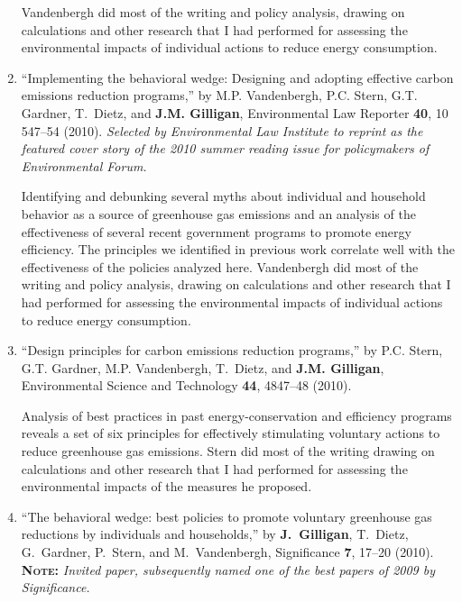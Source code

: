 \begin{enumerate}
\begin{credit}
	  Vandenbergh did most of the writing and policy analysis, drawing on calculations and other research that I had performed for assessing the environmental impacts of individual actions to reduce energy consumption.
	  \end{credit}
\fi
%	
	\item
	\enquote{Implementing the behavioral wedge: Designing and adopting effective
	  carbon emissions reduction programs,}  by M.P. Vandenbergh, P.C. Stern,
	  G.T. Gardner, T.~Dietz, and \textbf{J.M. Gilligan}, Environmental Law Reporter
	  \textbf{40}, 10\,547--54 (2010).  \emph{Selected by Environmental Law Institute to reprint as the featured cover story of the 2010 summer reading issue for policymakers of Environmental Forum.}
	  \begin{credit}
	  Identifying and debunking several myths about individual and household behavior as a source of greenhouse gas emissions and an analysis of the effectiveness of several recent government programs to promote energy efficiency. The principles we identified in previous work correlate well with the effectiveness of the policies analyzed here.
	  Vandenbergh did most of the writing and policy analysis, drawing on calculations and other research that I had performed for assessing the environmental impacts of individual actions to reduce energy consumption.
	  \end{credit}
%	
	\item
	\enquote{Design principles for carbon emissions reduction programs,}  by P.C.
	  Stern, G.T. Gardner, M.P. Vandenbergh, T.~Dietz, and \textbf{J.M. Gilligan},
	  Environmental Science and Technology \textbf{44}, 4847--48 (2010).  
	  \begin{credit}
	  Analysis of best practices in past energy-conservation and efficiency programs reveals a set of six principles for effectively stimulating voluntary actions to reduce greenhouse gas emissions.
	  Stern did most of the writing drawing on calculations and other research that I had performed for assessing the environmental impacts of the measures he proposed.
	  \end{credit}
%	
	\item
	\enquote{The behavioral wedge: best policies to promote voluntary greenhouse
	  gas reductions by individuals and households,}  by \textbf{J.~Gilligan}, T.~Dietz,
	  G.~Gardner, P.~Stern, and M.~Vandenbergh, Significance \textbf{7}, 17--20
	  (2010). {\bfseries\scshape Note:} \emph{Invited paper, subsequently named one of the best papers of 2009 by Significance.}  

\end{enumerate}
